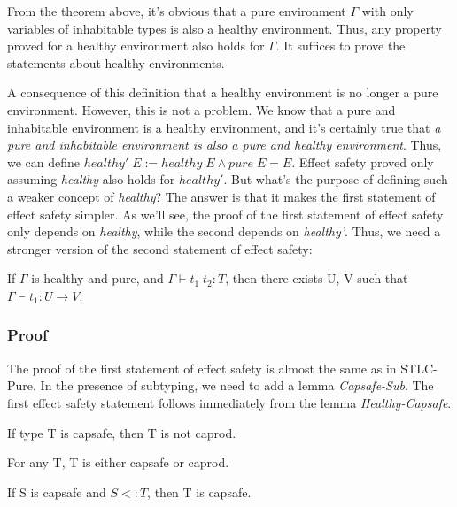 From the theorem above, it's obvious that a pure environment $\Gamma$
with only variables of inhabitable types is also a healthy
environment. Thus, any property proved for a healthy environment also
holds for $\Gamma$. It suffices to prove the statements about healthy
environments.

A consequence of this definition that a healthy environment is no
longer a pure environment. However, this is not a problem. We know
that a pure and inhabitable environment is a healthy environment, and
it's certainly true that \emph{a pure and inhabitable environment is
  also a pure and healthy environment}. Thus, we can define
$healthy' \; E := healthy \; E \wedge pure \; E = E$. Effect safety
proved only assuming \emph{healthy} also holds for $healthy'$. But
what's the purpose of defining such a weaker concept of
\emph{healthy}? The answer is that it makes the first statement of
effect safety simpler. As we'll see, the proof of the first statement
of effect safety only depends on \emph{healthy}, while the second
depends on \emph{healthy'}. Thus, we need a stronger version of the
second statement of effect safety:

\begin{definition}
  If $\Gamma$ is healthy and pure, and $\Gamma \vdash t_1 \; t_2 : T$,
  then there exists U, V such that $\Gamma \vdash t_1 : U \to V$.
\end{definition}

\subsubsection{Proof}

The proof of the first statement of effect safety is almost the same
as in STLC-Pure. In the presence of subtyping, we need to add a lemma
\emph{Capsafe-Sub}.  The first effect safety statement follows
immediately from the lemma \emph{Healthy-Capsafe}.

\begin{lemma}
 If type T is capsafe, then T is not caprod.
\end{lemma}

\begin{lemma}
 For any T, T is either capsafe or caprod.
\end{lemma}

\begin{lemma}
 If S is capsafe and $S <: T$, then T is capsafe.
\end{lemma}

